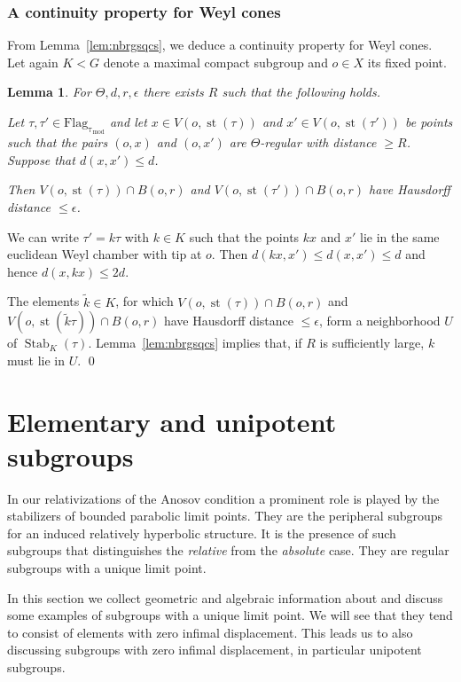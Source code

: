 \documentclass[12pt]{article}
\theoremstyle{boldplain}
\newtheorem{lem}[equation]{Lemma}
\theoremstyle{bolddefinition}
\numberwithin{equation}{section}
\def\eps{\epsilon}
\def\Flagt{\operatorname{Flag_{\tau_{mod}}}}
\def\st{\operatorname{st}}
\def\Stab{\operatorname{Stab}}
\begin{document}
\subsubsection{A continuity property for Weyl cones}

From Lemma~\ref{lem:nbrgsqcs}, we deduce a continuity property for Weyl cones.
Let again $K<G$ denote a maximal compact subgroup and $o\in X$ its fixed point. 

\begin{lem}
\label{lem:nbctffcns}
For $\Theta,d,r,\eps$ there exists $R$ such that the following holds. 

Let $\tau,\tau'\in\Flagt$ 
and let $x\in V(o,\st(\tau))$ and $x'\in V(o,\st(\tau'))$ be points 
such that the pairs $(o,x)$ and $(o,x')$ are $\Theta$-regular with distance $\geq R$.
Suppose that $d(x,x')\leq d$.

Then $V(o,\st(\tau))\cap B(o,r)$ and $V(o,\st(\tau'))\cap B(o,r)$ have Hausdorff distance $\leq\eps$.
\end{lem}
\proof
We can write $\tau'=k\tau$ with $k\in K$ such that the points $kx$ and $x'$ lie in the same euclidean Weyl chamber with tip at $o$.
Then $d(kx,x')\leq d(x,x')\leq d$
and hence $d(x,kx)\leq 2d$.

The elements $\tilde k\in K$,
for which $V(o,\st(\tau))\cap B(o,r)$ and $V(o,\st(\tilde k\tau))\cap B(o,r)$ have Hausdorff distance $\leq\eps$,
form a neighborhood $U$ of $\Stab_K(\tau)$. 
Lemma~\ref{lem:nbrgsqcs} implies that,
if $R$ is sufficiently large, $k$ must lie in $U$.
\qed


\section{Elementary and unipotent subgroups}

In our relativizations of the Anosov condition a prominent role is played by the stabilizers 
of bounded parabolic limit points.
They are the peripheral subgroups for an induced relatively hyperbolic structure.
It is the presence of such subgroups that distinguishes the {\em relative } from the {\em absolute} case. 
They are regular subgroups with a unique limit point.

In this section we collect geometric and algebraic information about and discuss some examples of subgroups with a unique limit point. 
We will see that they tend to consist of elements with zero infimal displacement.
This leads us to also discussing subgroups with zero infimal displacement,
in particular unipotent subgroups.
\end{document}
